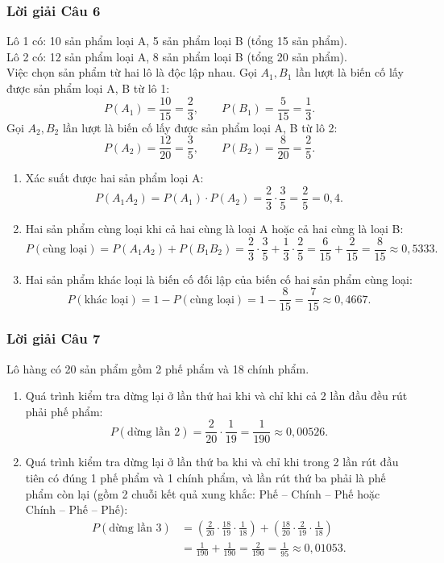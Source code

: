 \subsubsection*{Lời giải Câu 6}
Lô 1 có: 10 sản phẩm loại A, 5 sản phẩm loại B (tổng 15 sản phẩm).\\
Lô 2 có: 12 sản phẩm loại A, 8 sản phẩm loại B (tổng 20 sản phẩm).\\
Việc chọn sản phẩm từ hai lô là độc lập nhau.
Gọi $A_1, B_1$ lần lượt là biến cố lấy được sản phẩm loại A, B từ lô 1:
\[
P(A_1) = \frac{10}{15} = \frac{2}{3}, \qquad P(B_1) = \frac{5}{15} = \frac{1}{3}.
\]
Gọi $A_2, B_2$ lần lượt là biến cố lấy được sản phẩm loại A, B từ lô 2:
\[
P(A_2) = \frac{12}{20} = \frac{3}{5}, \qquad P(B_2) = \frac{8}{20} = \frac{2}{5}.
\]
\begin{enumerate}[label=\arabic*.]
    \item Xác suất được hai sản phẩm loại A:
    \[
    P(A_1 A_2) = P(A_1) \cdot P(A_2) = \frac{2}{3} \cdot \frac{3}{5} = \frac{2}{5} = 0{,}4.
    \]
    \item Hai sản phẩm cùng loại khi cả hai cùng là loại A hoặc cả hai cùng là loại B:
    \[
    P(\text{cùng loại}) = P(A_1 A_2) + P(B_1 B_2) = \frac{2}{3} \cdot \frac{3}{5} + \frac{1}{3} \cdot \frac{2}{5} = \frac{6}{15} + \frac{2}{15} = \frac{8}{15} \approx 0{,}5333.
    \]
    \item Hai sản phẩm khác loại là biến cố đối lập của biến cố hai sản phẩm cùng loại:
    \[
    P(\text{khác loại}) = 1 - P(\text{cùng loại}) = 1 - \frac{8}{15} = \frac{7}{15} \approx 0{,}4667.
    \]
\end{enumerate}

\subsubsection*{Lời giải Câu 7}
Lô hàng có 20 sản phẩm gồm 2 phế phẩm và 18 chính phẩm.
\begin{enumerate}[label=\alph*/]
    \item Quá trình kiểm tra dừng lại ở lần thứ hai khi và chỉ khi cả 2 lần đầu đều rút phải phế phẩm:
    \[
    P(\text{dừng lần 2}) = \frac{2}{20} \cdot \frac{1}{19} = \frac{1}{190} \approx 0{,}00526.
    \]
    \item Quá trình kiểm tra dừng lại ở lần thứ ba khi và chỉ khi trong 2 lần rút đầu tiên có đúng 1 phế phẩm và 1 chính phẩm, và lần rút thứ ba phải là phế phẩm còn lại (gồm 2 chuỗi kết quả xung khắc: Phế -- Chính -- Phế hoặc Chính -- Phế -- Phế):
    \begin{align*}
    P(\text{dừng lần 3}) &= \left(\frac{2}{20} \cdot \frac{18}{19} \cdot \frac{1}{18}\right) + \left(\frac{18}{20} \cdot \frac{2}{19} \cdot \frac{1}{18}\right) \\
                        &= \frac{1}{190} + \frac{1}{190} = \frac{2}{190} = \frac{1}{95} \approx 0{,}01053.
    \end{align*}
\end{enumerate}

